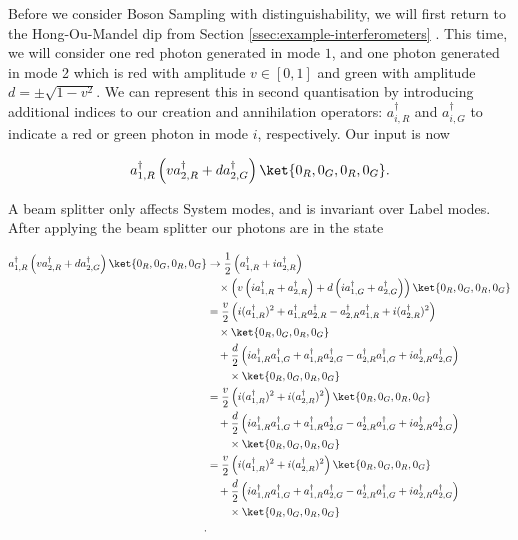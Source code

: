 Before we consider Boson Sampling with distinguishability, we will first return to the Hong-Ou-Mandel dip from Section \ref{ssec:example-interferometers} \cite{hong1987}. This time, we will consider one red photon generated in mode $1$, and one photon generated in mode 2 which is red with amplitude $v\in [0,1]$ and green with amplitude $d=\pm\sqrt{1-v^2}$. We can represent this in second quantisation by introducing additional indices to our creation and annihilation operators: $a_{i,R}^\dagger$ and $a_{i,G}^\dagger$ to indicate a red or green photon in mode $i$, respectively. Our input is now

\begin{equation}
a_{1,R}^\dagger\left(v a_{2,R}^\dagger + da_{2,G}^\dagger\right)\ket{0_R,0_G,0_R,0_G}.
\end{equation}

A beam splitter only affects System modes, and is invariant over Label modes. After applying the beam splitter our photons are in the state

\begin{align}
a_{1,R}^\dagger\left(v a_{2,R}^\dagger + da_{2,G}^\dagger\right)\ket{0_R,0_G,0_R,0_G} &\rightarrow \frac{1}{2}\left(a_{1,R}^\dagger + ia_{2,R}^\dagger\right)\nonumber\\
&\quad\times\left(v\left(ia_{1,R}^\dagger + a_{2,R}^\dagger\right) + d\left(ia_{1,G}^\dagger + a_{2,G}^\dagger\right)\right)\ket{0_R,0_G,0_R,0_G}\\
&= \frac{v}{2}\left(i(a_{1,R}^\dagger)^2 + a_{1,R}^\dagger a_{2,R}^\dagger - a_{2,R}^\dagger a_{1,R}^\dagger+i(a_{2,R}^\dagger)^2\right)\nonumber\\
&\quad\times\ket{0_R,0_G,0_R,0_G}\nonumber\\
&\quad+\frac{d}{2}\left(ia_{1,R}^\dagger a_{1,G}^\dagger + a_{1,R}^\dagger a_{2,G}^\dagger - a_{2,R}^\dagger a_{1,G}^\dagger+ia_{2,R}^\dagger a_{2,G}^\dagger \right)\nonumber\\
&\quad\quad\times\ket{0_R,0_G,0_R,0_G}\nonumber\\
&= \frac{v}{2}\left(i(a_{1,R}^\dagger)^2 +i(a_{2,R}^\dagger)^2\right)\ket{0_R,0_G,0_R,0_G}\nonumber\\
&\quad+\frac{d}{2}\left(ia_{1,R}^\dagger a_{1,G}^\dagger + a_{1,R}^\dagger a_{2,G}^\dagger - a_{2,R}^\dagger a_{1,G}^\dagger+ia_{2,R}^\dagger a_{2,G}^\dagger \right)\nonumber\\
&\quad\quad\times\ket{0_R,0_G,0_R,0_G}\nonumber\\
&= \frac{v}{2}\left(i(a_{1,R}^\dagger)^2 +i(a_{2,R}^\dagger)^2\right)\ket{0_R,0_G,0_R,0_G}\nonumber\\
&\quad+\frac{d}{2}\left(ia_{1,R}^\dagger a_{1,G}^\dagger + a_{1,R}^\dagger a_{2,G}^\dagger - a_{2,R}^\dagger a_{1,G}^\dagger+ia_{2,R}^\dagger a_{2,G}^\dagger \right)\nonumber\\
&\quad\quad\times\ket{0_R,0_G,0_R,0_G}\\.
\end{align}

